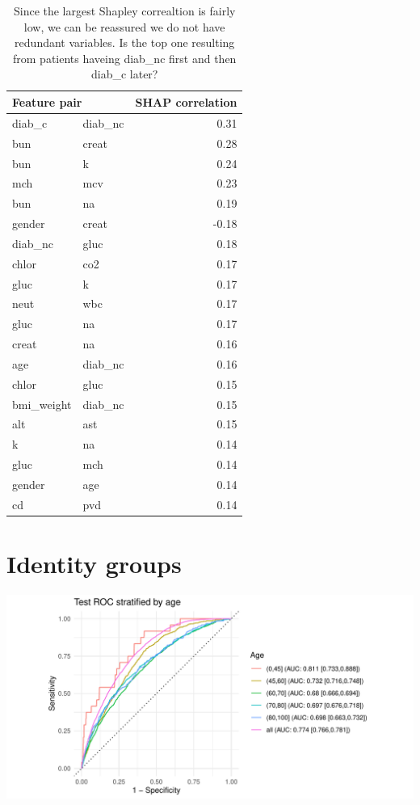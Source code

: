 \documentclass[12pt]{article}
\begin{document}
\clearpage
\begin{table}[h]
\centering
\begin{tabular}{llr}
\toprule
\multicolumn{2}{l}{Feature pair} & SHAP correlation \\
\midrule
diab\_c & diab\_nc & 0.31 \\ 
bun & creat & 0.28 \\ 
bun & k & 0.24 \\ 
mch & mcv & 0.23 \\ 
bun & na & 0.19 \\ \addlinespace
gender & creat & -0.18 \\ 
diab\_nc & gluc & 0.18 \\ 
chlor & co2 & 0.17 \\ 
gluc & k & 0.17 \\ 
neut & wbc & 0.17 \\ \addlinespace
gluc & na & 0.17 \\ 
creat & na & 0.16 \\ 
age & diab\_nc & 0.16 \\ 
chlor & gluc & 0.15 \\ 
bmi\_weight & diab\_nc & 0.15 \\ \addlinespace
alt & ast & 0.15 \\ 
k & na & 0.14 \\ 
gluc & mch & 0.14 \\ 
gender & age & 0.14 \\ 
cd & pvd & 0.14 \\  
\bottomrule
\end{tabular}
\caption{Since the largest Shapley correaltion is fairly low, we can be reassured we do not have redundant variables.
Is the top one resulting from patients haveing diab\_nc first and then diab\_c later?}
\end{table}


\clearpage
\section*{Identity groups}

\begin{center}
\includegraphics[width=\textwidth]{figures/roc_age.pdf}
\end{center}
\end{document}
